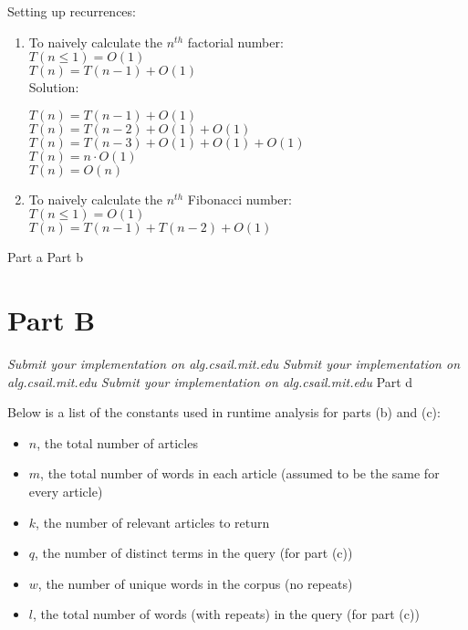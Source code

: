 \documentclass[12pt,twoside]{article}
\begin{document}
\begin{problems}
\begin{problemparts}
\begin{enumerate}
\end{enumerate}


\problempart Setting up recurrences:
\begin{enumerate}
	
	\item To naively calculate the $n^{th}$ factorial number: \\
	$T(n\leq1) = O(1)$ \\
	$T(n) = T(n-1) + O(1)$ \\
	
Solution:
\begin{center}
$ T(n) = T(n-1) + O(1)$\\
$ T(n) = T(n-2) + O(1) + O(1)$\\
$ T(n) = T(n-3) + O(1) + O(1) + O(1)$\\
$ T(n) = n \cdot O(1)$ \\
$ T(n) = O(n)$ \\
 \end{center}

	\item To naively calculate the $n^{th}$ Fibonacci number: \\
	$T(n\leq1) = O(1)$ \\
	$T(n) = T(n-1) + T(n-2) + O(1)$\\

\end{enumerate}
\end{problemparts}

\problem  %

\begin{problemparts}
\problempart Part a %
\problempart Part b %
\end{problemparts}

\section*{Part B}

\problem
\begin{problemparts}
\problempart \emph{Submit your implementation on alg.csail.mit.edu}
\problempart \emph{Submit your implementation on alg.csail.mit.edu}
\problempart \emph{Submit your implementation on alg.csail.mit.edu}
\problempart Part d %

Below is a list of the constants used in runtime analysis for parts (b) and (c):
\begin{itemize}
	\item $n$, the total number of articles
	\item $m$, the total number of words in each article (assumed to be the same for every article)
	\item $k$, the number of relevant articles to return
	\item $q$, the number of distinct terms in the query (for part (c))
	\item $w$, the number of unique words in the corpus (no repeats)
	\item $l$, the total number of words (with repeats) in the query (for part (c))
\end{itemize}


\end{problemparts}
\end{problems}
\end{document}
